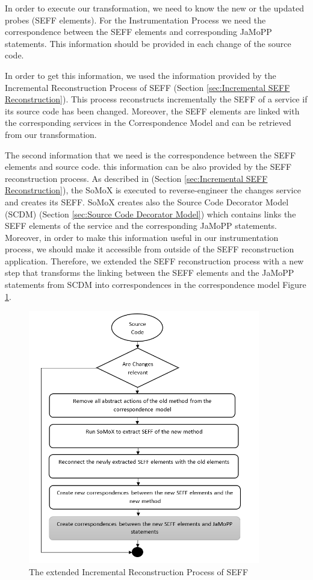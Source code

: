 In order to execute our transformation, we need to know the new or the updated probes (SEFF elements).  For the Instrumentation Process we need the correspondence between the SEFF elements and corresponding JaMoPP statements. This information should be provided in each change of the source code. 

In order to get this information, we used the information provided by the Incremental Reconstruction Process of SEFF (Section \ref{sec:Incremental SEFF Reconstruction}). This process reconstructs incrementally the SEFF of a service if its source code has been changed. Moreover, the SEFF elements are linked with the corresponding services in the Correspondence Model and can be retrieved from our transformation.

The second information that we need is the correspondence between the SEFF elements and source code. this information can be also provided by the SEFF reconstruction process. As described in (Section \ref{sec:Incremental SEFF Reconstruction}), the SoMoX is executed to reverse-engineer the changes service and creates its SEFF. SoMoX creates also the Source Code Decorator Model (SCDM) (Section \ref{sec:Source Code Decorator Model}) which contains links the SEFF elements of the service and the corresponding JaMoPP statements. Moreover, in order to make this information useful in our instrumentation process, we should make it accessible from outside of the SEFF reconstruction application. Therefore, we extended the SEFF reconstruction process with a new step that transforms the linking between the SEFF elements and the JaMoPP statements from SCDM into correspondences in the correspondence model Figure \ref{fig:seff_reconst_extension}. 


\begin{figure}[h]
\centering
\includegraphics[width=0.9\textwidth]{figures/seff_reconst_extension}
\caption{The extended Incremental Reconstruction Process of SEFF}
\label{fig:seff_reconst_extension}
\end{figure}


